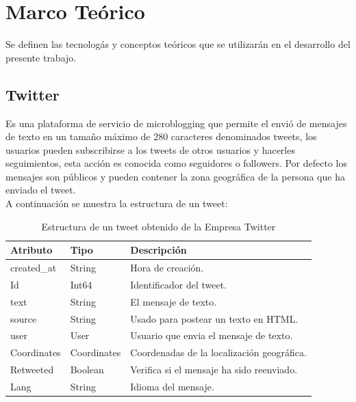%
\chapter{Marco Te\'orico}

Se definen las tecnolog\'as y conceptos te\'oricos que se utilizar\'an en el desarrollo del presente trabajo.


\section{Twitter}
\setcounter{equation}{0}

Es una plataforma de servicio de microblogging que permite el envi\'o de mensajes de texto en un tamaño m\'aximo de 280 caracteres denominados tweets, los usuarios pueden subscribirse a los tweets de otros usuarios y hacerles seguimientos, esta acci\'on es conocida como seguidores o followers. Por defecto los mensajes son p\'ublicos y pueden contener la zona geogr\'afica de la persona que ha enviado el tweet.\\

A continuaci\'on se muestra la estructura de un tweet:

\begin{table}[H]

\begin{center}
\begin{tabular}{ |p{2cm}|p{2cm}|p{6cm}| }
\hline
\rowcolor{gray!40}  \textbf{Atributo}         & \textbf{Tipo}      & \textbf{Descripci\'on}   \\  \hline
 created\_at   & String  & Hora de creaci\'on.        \\   \hline
 Id                  & Int64   & Identificador del tweet.  \\   \hline
 text                & String  & El mensaje de texto.  \\   \hline
 source           & String  & Usado para postear un texto en HTML.  \\   \hline
 user               & User    & Usuario que envia el mensaje de texto.  \\   \hline
 Coordinates   & Coordinates   & Coordenadas de la localizaci\'on geogr\'afica.  \\   \hline
 Retweeted     & Boolean   & Verifica si el mensaje ha sido reenviado.  \\   \hline
 Lang               & String   & Idioma del mensaje.  \\   \hline
\end{tabular}
\caption{Estructura de un tweet obtenido de la Empresa Twitter}

\end{center}
\end{table}
		
